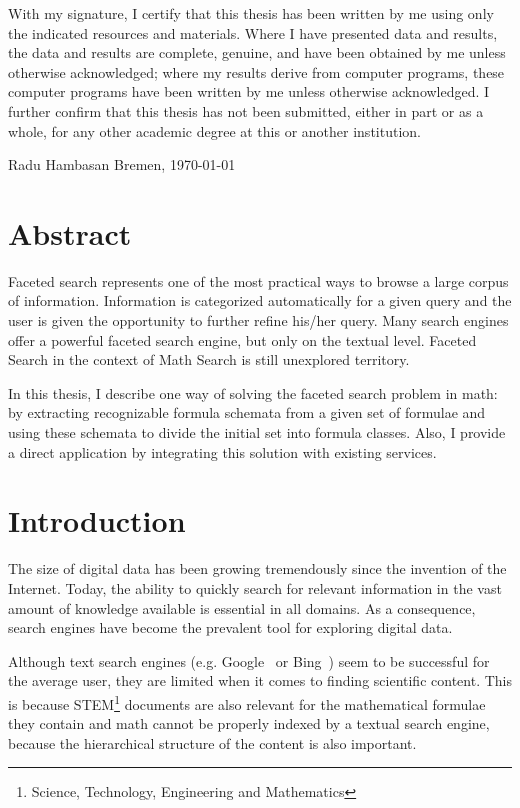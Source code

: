 \newpage
\thispagestyle{empty}

With my signature, I certify that this thesis has been written by me using
only the indicated resources and materials. Where I have presented data and
results, the data and results are complete, genuine, and have been obtained by
me unless otherwise acknowledged; where my results derive from computer
programs, these computer programs have been written by me unless otherwise
acknowledged. I further confirm that this thesis has not been submitted, either
in part or as a whole, for any other academic degree at this or another
institution.

\vspace{20mm}

Radu Hambasan \hfill Bremen, \today

\newpage

\section*{Abstract}
Faceted search represents one of the most practical ways to browse a large
corpus of information. Information is categorized automatically for
a given query and the user is given the opportunity to further refine
his/her query. Many search engines offer a powerful faceted search engine,
but only on the textual level. Faceted Search in the context of Math Search
is still unexplored territory.

In this thesis, I describe one way of solving the faceted search problem in
math: by extracting recognizable formula schemata from a given set of formulae
and using these schemata to divide the initial set into formula classes. Also,
I provide a direct application by integrating this solution with existing
services.

\tableofcontents

\clearpage {}

\section{Introduction}\label{sec:intro}

The size of digital data has been growing tremendously since the invention
of the Internet. Today, the ability to quickly search for relevant information
in the vast amount of knowledge available is essential in all domains.
As a consequence, search engines have become the prevalent tool for exploring
digital data.

Although text search engines (e.g. Google~\cite{google:online} or
Bing~\cite{bing:online}) seem to be successful for the average user, they are
limited when it comes to finding scientific content. This is because
STEM\footnote{Science, Technology, Engineering and Mathematics} documents are
also relevant for the mathematical formulae they contain and math cannot be
properly indexed by a textual search engine, because the hierarchical structure
of the content is also important.

